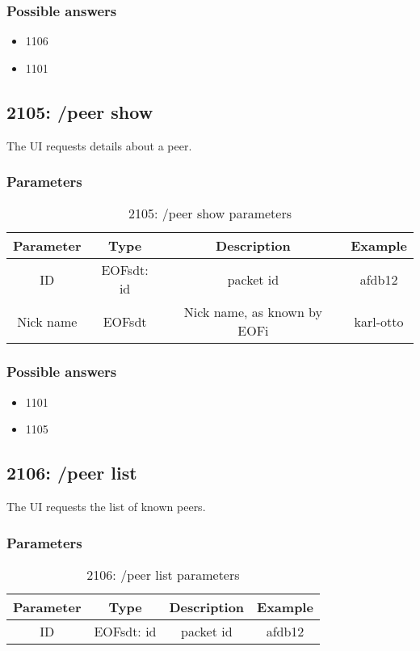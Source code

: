 \documentclass[12pt,a4paper]{book}
\begin{document}
\subsubsection{Possible answers}
\begin{itemize}
\item 1106
\item 1101
\end{itemize}

\subsection{2105: /peer show}
The UI requests details about a peer.

\subsubsection{Parameters}
\begin{longtable}{|c|c|c|c|}
\caption{2105: /peer show parameters}\\
\hline
\textbf{Parameter} & \textbf{Type} & \textbf{Description} & \textbf{Example}\\
\hline
ID & EOFsdt: id & packet id & afdb12\\
\hline
Nick name & EOFsdt & Nick name, as known by EOFi & karl-otto\\
\hline
\end{longtable}

\subsubsection{Possible answers}
\begin{itemize}
\item 1101
\item 1105
\end{itemize}
\subsection{2106: /peer list}
The UI requests the list of known peers.

\subsubsection{Parameters}
\begin{longtable}{|c|c|c|c|}
\caption{2106: /peer list parameters}\\
\hline
\textbf{Parameter} & \textbf{Type} & \textbf{Description} & \textbf{Example}\\
\hline
ID & EOFsdt: id & packet id & afdb12\\
\hline
\end{longtable}
\end{document}
